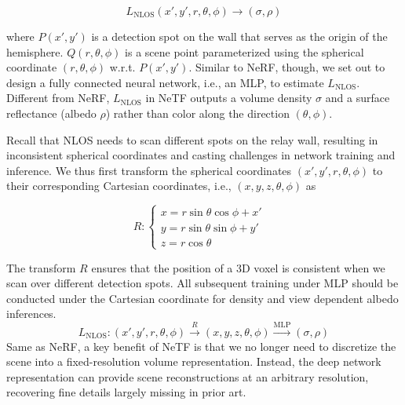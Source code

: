 \documentclass[10pt,journal,compsoc]{IEEEtran}
\begin{document}
\begin{equation}
L_{\text{NLOS}}(x', y', r, \theta, \phi) \to (\sigma, \rho)
\end{equation}

\noindent where $P(x', y')$ is a detection spot on the wall that serves as the origin of the hemisphere. $Q(r, \theta, \phi)$ is a scene point parameterized using the spherical coordinate $(r, \theta, \phi)$ w.r.t. $P(x', y')$. Similar to NeRF, though, we set out to design a fully connected neural network, i.e., an MLP, to estimate $L_{\text{NLOS}}$. Different from NeRF, $L_{\text{NLOS}}$ in NeTF outputs a volume density $\sigma$ and a surface reflectance (albedo $\rho$) rather than color along the direction $(\theta, \phi)$. 

Recall that NLOS needs to scan different spots on the relay wall, resulting in inconsistent spherical coordinates and casting challenges in network training and inference. We thus first transform the spherical coordinates $(x',y', r, \theta,\phi)$ to their corresponding Cartesian coordinates, i.e.,  $(x, y, z, \theta,\phi)$ as 

\begin{equation}
R:
 \left\{
             \begin{array}{lr}
             x=r \sin\theta \cos\phi + x' &  \\
             y=r \sin\theta \sin\phi + y' & \\
             z=r \cos\theta &  
             \end{array}
\right.
\label{transform}
\end{equation}

The transform $R$ ensures that the position of a 3D voxel is consistent when we scan over different detection spots. All subsequent training under MLP should be conducted under the Cartesian coordinate for density and view dependent albedo inferences. 
{
\begin{equation}
L_{\text{NLOS}}:(x',y', r, \theta,\phi) \stackrel{R}{\longrightarrow} (x, y, z, \theta, \phi) \stackrel{\text{MLP}}{\longrightarrow} (\sigma, \rho)
\end{equation}
}
Same as NeRF, a key benefit of NeTF is that we no longer need to discretize the scene into a fixed-resolution volume representation. Instead, the deep network representation can provide scene reconstructions at an arbitrary resolution, recovering fine details largely missing in prior art.  

\end{document}
